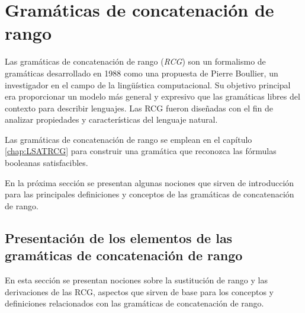 
\chapter{Gramáticas de concatenación de rango}
\label{chap:RCG}




Las gramáticas de concatenación de rango (\textit{RCG}) \cite{mainRCGBib} son un formalismo de gramáticas desarrollado en 1988 como una 
propuesta de Pierre Boullier, un investigador en el campo de la lingüística computacional. Su objetivo principal 
era proporcionar un modelo más general y expresivo que las gramáticas libres del contexto para describir lenguajes. 
Las RCG fueron diseñadas con el fin de analizar propiedades y características del lenguaje natural.

Las gramáticas de concatenación de rango se emplean en el capítulo \ref{chap:LSATRCG} para construir una 
gramática que reconozca las fórmulas booleanas satisfacibles.

En la próxima sección se presentan algunas nociones que sirven de introducción para las principales definiciones y conceptos
de las gramáticas de concatenación de rango.

\section{Presentación de los elementos de las gramáticas de concatenación de rango}

En esta sección se presentan nociones sobre la sustitución de rango y las derivaciones de las RCG, aspectos 
que sirven de base para los conceptos y definiciones relacionados con las gramáticas de concatenación de rango.

